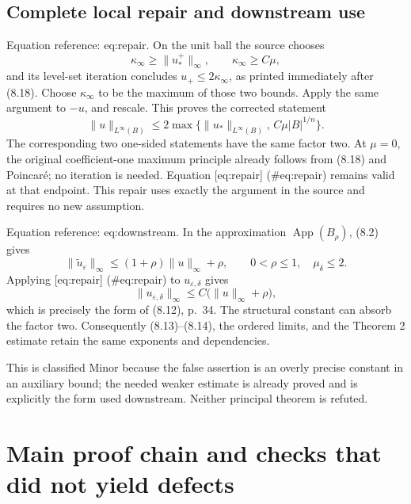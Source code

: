 \documentclass[10pt]{article}
\begin{document}
\subsection*{Complete local repair and downstream use}
Equation reference: eq:repair. On the unit ball the source chooses \[\kappa_\infty\geq\|u_*^+\|_\infty,\qquad
 \kappa_\infty\geq C\mu,\] and its level-set iteration concludes \(u_+\leq2\kappa_\infty\), as printed immediately after (8.18). Choose \(\kappa_\infty\) to be the maximum of those two bounds. Apply the same argument to \(-u\), and rescale. This proves the corrected statement \[
 \|u\|_{L^\infty(B)}
 \leq2\max\{\|u_*\|_{L^\infty(B)},\,C\mu|B|^{1/n}\}.\] The corresponding two one-sided statements have the same factor two. At \(\mu=0\), the original coefficient-one maximum principle already follows from (8.18) and Poincaré; no iteration is needed. Equation [eq:repair] (\#eq:repair) remains valid at that endpoint. This repair uses exactly the argument in the source and requires no new assumption.\par
Equation reference: eq:downstream. In the approximation \(\operatorname{App}(B_\rho)\), (8.2) gives \[\|\widetilde u_\varepsilon\|_\infty
 \leq(1+\rho)\|u\|_\infty+\rho,\qquad
 0<\rho\leq1,\quad \mu_\delta\leq2.\] Applying [eq:repair] (\#eq:repair) to \(u_{\varepsilon,\delta}\) gives \[
 \|u_{\varepsilon,\delta}\|_\infty
 \leq C\bigl(\|u\|_\infty+\rho\bigr),\] which is precisely the form of (8.12), p. 34. The structural constant can absorb the factor two. Consequently (8.13)–(8.14), the ordered limits, and the Theorem 2 estimate retain the same exponents and dependencies.\par
This is classified Minor because the false assertion is an overly precise constant in an auxiliary bound; the needed weaker estimate is already proved and is explicitly the form used downstream. Neither principal theorem is refuted.\par
\section*{Main proof chain and checks that did not yield defects}
\end{document}
